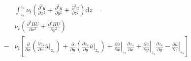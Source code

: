                                                         \begin{equation}
                                                          \begin{aligned}
    &\int_{z_{b}}^{ z_{s}}\!
    \nu_{t}
    \left(
      \frac{\partial^{2} \overline{u}}{\partial x^{2}} +
      \frac{\partial^{2} \overline{u}}{\partial y^{2}} +
      \frac{\partial^{2} \overline{u}}{\partial z^{2}}
    \right)
    \mathrm{d}z =\\
    &
    \nu_{t}
    \left(
      \frac{\partial^{2} HU}{\partial x^{2}} +
      \frac{\partial^{2} HU}{\partial y^{2}}
    \right)
    \\
                                                            -&\nu_{t}
                                                            \left[
                                                              \frac{\partial}{\partial x}
                                                              \left(
                                                                \frac{\partial  z_{s}}{\partial x}
                                                                \left.\overline{u}\right|_{z_{s}}
                                                                \right)
                                                                +
                                                                \frac{\partial}{\partial y}
                                                                \left(
                                                                  \frac{\partial  z_{s}}{\partial y}
                                                                  \left.\overline{u}\right|_{z_{s}}
                                                                  \right)
                                                                  +
                                                                  \left.\frac{\partial \overline{u}}{\partial x}\right|_{z_{s}}
                                                                    \frac{\partial  z_{s}}{\partial x}
                                                                    +
                                                                    \left.\frac{\partial \overline{u}}{\partial y}\right|_{z_{s}}
                                                                      \frac{\partial  z_{s}}{\partial y}
                                                                      -
                                                                      \left.\frac{\partial \overline{u}}{\partial z}\right|_{z_{s}}
                                                                      \right]

\end{aligned}
\end{equation}
